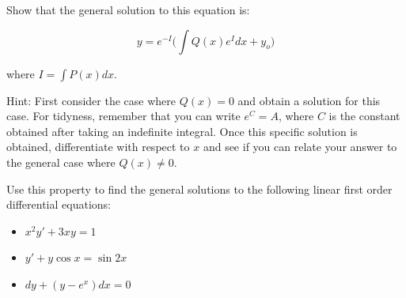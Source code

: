 \documentclass{article}
\begin{document}
  Show that the general solution to this equation is:
  
  \begin{equation}
  y=e^{-I}\Bigg(\int Q(x)e^{I}dx+y_o\Bigg)     
  \end{equation}
  
  where $I=\int P(x)dx$.
  
  Hint: First consider the case where $Q(x)=0$ and obtain a solution for this case. For tidyness, remember that you can write $e^C=A$, where $C$ is the constant obtained after taking an indefinite integral. Once this specific solution is obtained, differentiate with respect to $x$ and see if you can relate your answer to the general case where $Q(x)\neq0$. 
  
  Use this property to find the general solutions to the following linear first order differential equations:
  \centering
  \begin{itemize}
    \centering
      \item $x^2y'+3xy=1$
      \item $y'+y\cos{x}=\sin{2x}$
      \item $dy+(y-e^x)dx=0$
  \end{itemize}
  
\end{document}
